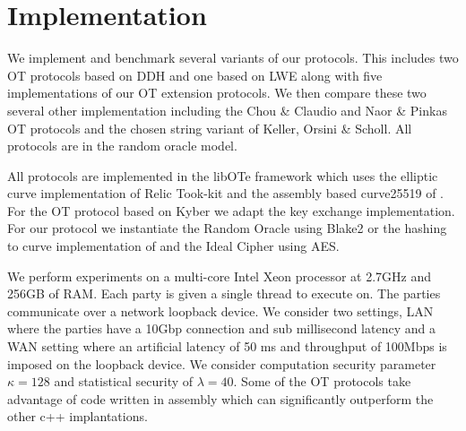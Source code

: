 \section{Implementation}

We implement and benchmark several variants of our protocols. This includes two OT protocols based on DDH and one based on LWE along with five implementations of our OT extension protocols. We then compare these two several other implementation including the Chou \& Claudio \cite{LC:ChoOrl15} and Naor \& Pinkas \cite{SODA:NaoPin01} OT protocols and the chosen string variant of Keller, Orsini \& Scholl\cite{C:KelOrsSch15}.  All protocols are in the random oracle model.

All protocols are implemented in the libOTe framework\cite{libOTe} which uses the elliptic curve implementation of Relic Took-kit\cite{relic} and the assembly based curve25519 of \cite{LC:ChoOrl15,simplest}. For the OT protocol based on Kyber we adapt the \cite{kyber} key exchange implementation. For our protocol we instantiate the Random Oracle using Blake2 or the hashing to curve implementation of \cite{relic} and the Ideal Cipher using AES.

We perform experiments on a multi-core Intel Xeon processor at 2.7GHz and 256GB of RAM. Each party is given a single thread to execute on. The parties communicate over a network loopback device. We consider two settings, LAN where the parties have a 10Gbp connection and sub millisecond latency and a WAN setting where an artificial latency of 50 ms and throughput of 100Mbps is imposed on the loopback device. We consider computation security parameter $\kappa=128$ and statistical security of $\lambda=40$.  Some of the OT protocols take advantage of code written in assembly which can significantly outperform the other c++ implantations.


